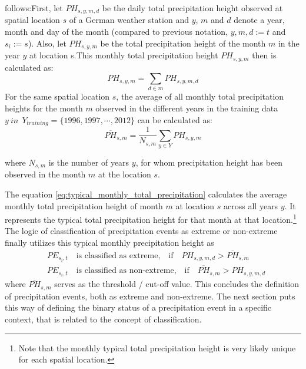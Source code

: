 \documentclass[
  12pt,
]{article}
\begin{document}
follows:\newline First, let \(PH_{s,y,m,d}\) be the daily total
precipitation height observed at spatial location \(s\) of a German
weather station and \(y\), \(m\) and \(d\) denote a year, month and day
of the month (compared to previous notation, \(y,m,d:=t\) and
\(s_i:=s\)). Also, let \(PH_{s,y,m}\) be the total precipitation height
of the month \(m\) in the year \(y\) at location s.\newline This monthly
total precipitation height \(PH_{s,y,m}\) then is calculated as:
\begin{equation}\label{eq:monthly_total_precipitation_height}
PH_{s,y,m} = \sum_{d \in m}PH_{s,y,m,d}
\end{equation} For the same spatial location \(s\), the average of all
monthly total precipitation heights for the month \(m\) observed in the
different years in the training data
\(y\:in\:\: Y_{training}={\{1996,1997,\cdots,2012\}}\) can be calculated
as: \vspace{-0.25cm}
\begin{equation}\label{eq:typical_monthly_total_precipitation}
\overline{PH}_{s,m} = \frac{1}{N_{s,m}}\sum_{y\in Y}PH_{s,y,m}
\end{equation}

where \(N_{s,m}\) is the number of years \(y\), for whom precipitation
height has been observed in the month \(m\) at the location \(s\).

The equation \ref{eq:typical_monthly_total_precipitation} calculates the
average monthly total precipitation height of month \(m\) at location
\(s\) across all years \(y\). It represents the typical total
precipitation height for that month at that
location.\footnote{Note that the monthly typical total precipitation height is very likely unique for each spatial location.}
The logic of classification of precipitation events as extreme or
non-extreme finally utilizes this typical monthly precipitation height
as \begin{align}
&PE_{s_{i},t}\quad\text{is classified as extreme,}\quad\text{if}\quad PH_{s,y,m,d}>\overline{PH}_{s,m}\label{definition_epe}\\  
&PE_{s_{i},t}\quad\text{is classified as non-extreme,}\quad\text{if}\quad \overline{PH}_{s,m}> PH_{s,y,m,d}\label{definition_non_epe}
\end{align} where \(\overline{PH}_{s,m}\) serves as the threshold /
cut-off value. This concludes the definition of precipitation events,
both as extreme and non-extreme. The next section puts this way of
defining the binary status of a precipitation event in a specific
context, that is related to the concept of classification.
\end{document}
